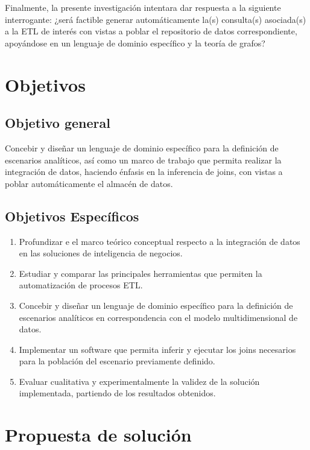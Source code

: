 Finalmente, la presente investigación intentara dar respuesta a la siguiente interrogante: ¿será factible generar 
automáticamente la(s) consulta(s) asociada(s) a la ETL de interés con vistas a poblar el repositorio de datos 
correspondiente, apoy\'andose en un lenguaje de dominio espec\'ifico y la teor\'ia de grafos?

\section{Objetivos}

\subsection{Objetivo general}

Concebir y diseñar un lenguaje de dominio específico para la definici\'on de escenarios analíticos, as\'i como un marco 
de trabajo que permita realizar la integración de datos, haciendo énfasis en la inferencia de joins, 
con vistas a poblar automáticamente el almacén de datos.

\subsection{Objetivos Espec\'ificos}

\begin{enumerate}
    \item Profundizar e el marco te\'orico conceptual respecto a la integración de datos en las soluciones de 
        inteligencia de negocios.  
    \item Estudiar y comparar las principales herramientas que permiten la automatización de procesos ETL.
    \item Concebir y diseñar un lenguaje de dominio específico para la definici\'on de escenarios analíticos en 
        correspondencia con el modelo multidimensional de datos.
    \item Implementar un software que permita inferir y ejecutar los joins necesarios para la población del escenario 
        previamente definido.
    \item Evaluar cualitativa y experimentalmente la validez de la solución implementada, partiendo de los resultados 
        obtenidos.
\end{enumerate}

\section{Propuesta de soluci\'on}

